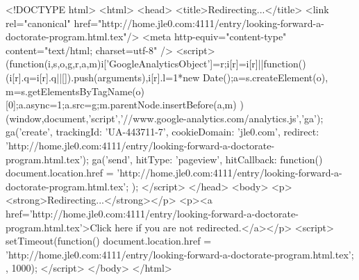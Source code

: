 <!DOCTYPE html>
<html>
<head>
<title>Redirecting...</title>
<link rel="canonical" href="http://home.jle0.com:4111/entry/looking-forward-a-doctorate-program.html.tex"/>
<meta http-equiv="content-type" content="text/html; charset=utf-8" />
<script>
(function(i,s,o,g,r,a,m){i['GoogleAnalyticsObject']=r;i[r]=i[r]||function(){
(i[r].q=i[r].q||[]).push(arguments)},i[r].l=1*new Date();a=s.createElement(o),
m=s.getElementsByTagName(o)[0];a.async=1;a.src=g;m.parentNode.insertBefore(a,m)
})(window,document,'script','//www.google-analytics.com/analytics.js','ga');
ga('create', { trackingId: 'UA-443711-7', cookieDomain: 'jle0.com', redirect: 'http://home.jle0.com:4111/entry/looking-forward-a-doctorate-program.html.tex'});
ga('send', { hitType: 'pageview', hitCallback: function() { document.location.href = 'http://home.jle0.com:4111/entry/looking-forward-a-doctorate-program.html.tex'; } });
</script>
</head>
<body>
  <p><strong>Redirecting...</strong></p>
  <p><a href='http://home.jle0.com:4111/entry/looking-forward-a-doctorate-program.html.tex'>Click here if you are not redirected.</a></p>
  <script>
    setTimeout(function() { document.location.href = 'http://home.jle0.com:4111/entry/looking-forward-a-doctorate-program.html.tex'; }, 1000);
  </script>
</body>
</html>
